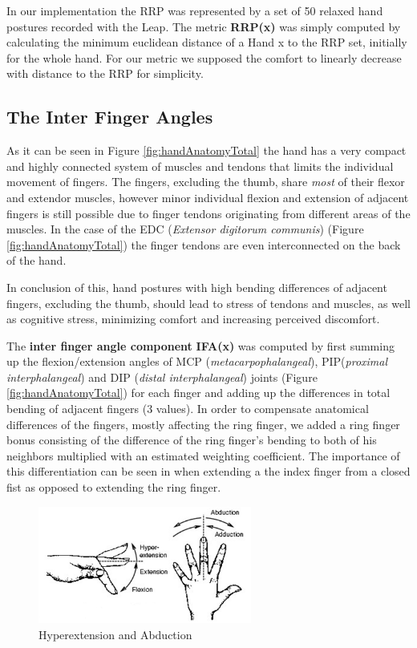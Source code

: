 \documentclass{sig-alternate-05-2015}
\begin{document}
In our implementation the RRP was represented by a set of 50 relaxed hand postures recorded with the Leap. The metric \textbf{RRP(x)} was simply computed by calculating the minimum euclidean distance of a Hand x to the RRP set, initially for the whole hand. 
For our metric we supposed the comfort to linearly decrease with distance to the RRP for simplicity.

\subsection{The Inter Finger Angles}

As it can be seen in Figure \ref{fig:handAnatomyTotal}
the hand has a very compact and highly connected system of muscles and tendons that limits the individual movement of fingers.
The fingers, excluding the thumb, share \textsl{most} of their flexor and extendor muscles, however minor individual flexion and extension of adjacent fingers is still possible due to finger tendons originating from different areas of the muscles. In the case of the EDC (\textit{Extensor digitorum communis}) (Figure \ref{fig:handAnatomyTotal}) the finger tendons are even interconnected on the back of the hand. 

In conclusion of this, hand postures with high bending differences of adjacent fingers, excluding the thumb, should lead to stress of tendons and muscles, as well as cognitive stress, minimizing comfort and increasing perceived discomfort.

The \textbf{inter finger angle component} \textbf{IFA(x)} was computed by first summing up the flexion/extension angles of MCP (\textit{metacarpophalangeal}), PIP(\textit{proximal interphalangeal}) and DIP (\textit{distal interphalangeal}) joints (Figure \ref{fig:handAnatomyTotal}) for each finger and adding up the differences in total bending of adjacent fingers (3 values). In order to compensate anatomical differences of the fingers, mostly affecting the ring finger, we added a ring finger bonus consisting of the difference of the ring finger's bending to both of his neighbors multiplied with an estimated weighting coefficient. The importance of this differentiation can be seen in when extending a the index finger from a closed fist as opposed to extending the ring finger. 

\begin{figure}[b]
\centering
\includegraphics[width=7cm]{abduction}
\vspace{-20pt}
\caption{Hyperextension and Abduction}
\label{fig:hyperabduction}
\vspace{-10pt}
\end{figure}
\end{document}
